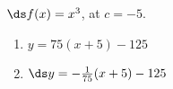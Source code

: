 {$\ds f(x) = x^3$, at $c=-5$.
}
{\begin{enumerate}
\item		$y = 75(x+5)-125$
\item		$\ds y = -\frac{1}{75}(x+5)-125$
\end{enumerate}
}
